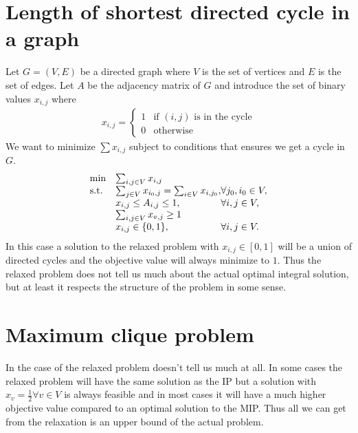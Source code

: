 \begin{example}
\section{Length of shortest directed cycle in a graph}
Let $G=(V,E)$ be a directed graph where $V$ is the set of vertices and $E$ is the set of edges. Let $A$ be the adjacency matrix of $G$ and introduce the set of binary values $x_{i,j}$ where
\begin{align*}
x_{i,j} = \left\{
\begin{array}{ll}
1 & \text{if } (i,j) \text{ is in the cycle} \\ 0 & \text{otherwise}
\end{array}\right.
\end{align*}
We want to minimize $\sum x_{i,j}$ subject to conditions that ensures we get a cycle in $G$.
\begin{align}
\begin{array}{ll@{}ll}
\text{min} & \sum_{i,j \in V}x_{i,j}&\\
\text{s.t.} & \sum_{j\in V}x_{i_0,j} = \sum_{i\in V}x_{i,j_0},& \forall j_0,i_0 \in V,\\
&x_{i,j}\leq A_{i,j} \leq 1,&\forall i,j \in V,\\
&\sum_{i,j\in V}x_{v,j} \geq 1&\\
&x_{i,j} \in \{0,1\},&\forall i,j \in V.\\
\end{array}
\end{align}
In this case a solution to the relaxed problem with $x_{i,j} \in [0,1]$ will be a union of directed cycles and the objective value will always minimize to $1$. Thus the relaxed problem does not tell us much about the actual optimal integral solution, but at least it respects the structure of the problem in some sense.\\
\section{Maximum clique problem}
In the case of  the relaxed problem doesn't tell us much at all. In some cases the relaxed problem will have the same solution as the IP but a solution with $x_v = \frac{1}{2} \forall v \in V$ is always feasible and in most cases it will have a much higher objective value compared to an optimal solution to the MIP. Thus all we can get from the relaxation is an upper bound of the actual problem.
\end{example}
